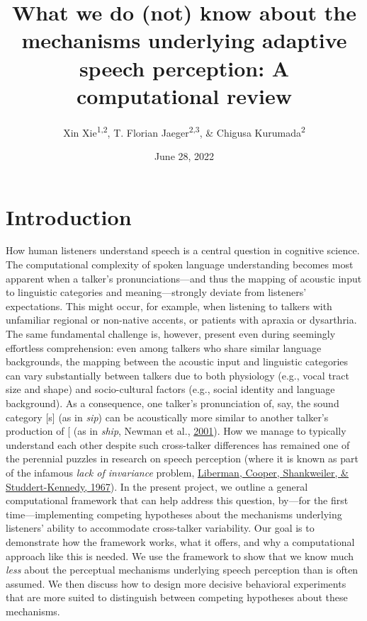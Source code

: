 \documentclass[
  11pt,
  english,
  man,floatsintext]{apa6}
\title{What we do (not) know about the mechanisms underlying adaptive speech perception: A computational review}
\author{Xin Xie\textsuperscript{1,2}, T. Florian Jaeger\textsuperscript{2,3}, \& Chigusa Kurumada\textsuperscript{2}}
\date{June 28, 2022}
\affiliation{\vspace{0.5cm}\textsuperscript{1} Language Science, University of California, Irvine\\\textsuperscript{2} Brain and Cognitive Sciences, University of Rochester\\\textsuperscript{3} Computer Science, University of Rochester}
\begin{document}
\maketitle

\hypertarget{introduction}{%
\section{Introduction}\label{introduction}}

How human listeners understand speech is a central question in cognitive science. The computational complexity of spoken language understanding becomes most apparent when a talker's pronunciations---and thus the mapping of acoustic input to linguistic categories and meaning---strongly deviate from listeners' expectations. This might occur, for example, when listening to talkers with unfamiliar regional or non-native accents, or patients with apraxia or dysarthria. The same fundamental challenge is, however, present even during seemingly effortless comprehension: even among talkers who share similar language backgrounds, the mapping between the acoustic input and linguistic categories can vary substantially between talkers due to both physiology (e.g., vocal tract size and shape) and socio-cultural factors (e.g., social identity and language background). As a consequence, one talker's pronunciation of, say, the sound category {[}s{]} (as in \emph{sip}) can be acoustically more similar to another talker's production of {[}\ipatext{ʃ}{]} (as in \emph{ship}, Newman et al., \protect\hyperlink{ref-newman2001}{2001}). How we manage to typically understand each other despite such cross-talker differences has remained one of the perennial puzzles in research on speech perception (where it is known as part of the infamous \emph{lack of invariance} problem, \protect\hyperlink{ref-liberman1967}{Liberman, Cooper, Shankweiler, \& Studdert-Kennedy, 1967}). In the present project, we outline a general computational framework that can help address this question, by---for the first time---implementing competing hypotheses about the mechanisms underlying listeners' ability to accommodate cross-talker variability. Our goal is to demonstrate how the framework works, what it offers, and why a computational approach like this is needed. We use the framework to show that we know much \emph{less} about the perceptual mechanisms underlying speech perception than is often assumed. We then discuss how to design more decisive behavioral experiments that are more suited to distinguish between competing hypotheses about these mechanisms.
\end{document}
